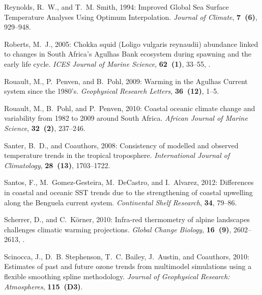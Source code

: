\documentclass[]{ametsoc}
\begin{document}
\begin{thebibliography}{41}
Reynolds, R.~W., and T.~M. Smith, 1994: {Improved Global Sea Surface
  Temperature Analyses Using Optimum Interpolation}. \textit{Journal of
  Climate}, \textbf{7~(6)}, 929--948.

Roberts, M.~J., 2005: {Chokka squid (Loligo vulgaris reynaudii) abundance
  linked to changes in South Africa's Agulhas Bank ecosystem during spawning
  and the early life cycle}. \textit{ICES Journal of Marine Science},
  \textbf{62~(1)}, 33--55, .

Rouault, M., P.~Penven, and B.~Pohl, 2009: {Warming in the Agulhas Current
  system since the 1980's}. \textit{Geophysical Research Letters},
  \textbf{36~(12)}, 1--5.

Rouault, M., B.~Pohl, and P.~Penven, 2010: {Coastal oceanic climate change and
  variability from 1982 to 2009 around South Africa}. \textit{African Journal
  of Marine Science}, \textbf{32~(2)}, 237--246.

Santer, B.~D., and Coauthors, 2008: Consistency of modelled and observed
  temperature trends in the tropical troposphere. \textit{International Journal
  of Climatology}, \textbf{28~(13)}, 1703--1722.

Santos, F., M.~Gomez-Gesteira, M.~DeCastro, and I.~Alvarez, 2012: {Differences
  in coastal and oceanic SST trends due to the strengthening of coastal
  upwelling along the Benguela current system}. \textit{Continental Shelf
  Research}, \textbf{34}, 79--86.

Scherrer, D., and C.~K{\"{o}}rner, 2010: {Infra-red thermometry of alpine
  landscapes challenges climatic warming projections}. \textit{Global Change
  Biology}, \textbf{16~(9)}, 2602--2613,
  .

Scinocca, J., D.~B. Stephenson, T.~C. Bailey, J.~Austin, and Coauthors, 2010:
  Estimates of past and future ozone trends from multimodel simulations using a
  flexible smoothing spline methodology. \textit{Journal of Geophysical
  Research: Atmospheres}, \textbf{115~(D3)}.


\end{thebibliography}
\end{document}
